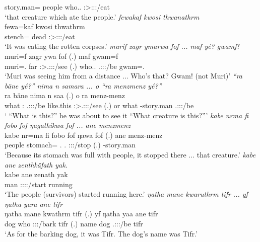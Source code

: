 \begin{exe}
	{\Dem} story.man={\Only} {\Emph} people who.\Erg.{\Sg} \Sg:\Sbj>\Stpl:\Obj:\Pst:\Ipfv/eat {\Emph}\\
	\trans `that creature which ate the people.'
	\emph{fewakaf kwosi thwanathrm}\\
	\gll fewa=kaf kwosi thwathrm\\ 
	stench={\Prop} dead \Sg:\Sbj>\Stpl:\Obj:\Pst:\Dur/eat\\
	\trans `It was eating the rotten corpses.'
	\emph{murif zagr ymarwa fof ... maf yé? gwamf!}\\
	\gll muri=f zagr ywa fof (.) maf  gwam=f\\ 
	muri=\Erg.{\Sg} far \Sg:\Sbj>\Tsg.\Masc:\Obj:\Pst:\Ipfv/see {\Emph} (.) who.\Erg.{\Sg} \Tsg.\Masc:\Sbj:\Nonpast:\Ipfv/be gwam=\Erg.\Sg\\
	\trans `Muri was seeing him from a distance ... Who's that? Gwam! (not Muri)'
	\emph{``ra bäne yé?'' nima n samara ... o ``ra menzmenz yé?''}\\
	\gll ra bäne  nima n saa (.) o ra menz-menz \\ 
	what \Dem:\Med{} \Tsg.\Masc:\Sbj:\Nonpast:\Ipfv/be like.this {\Imn} \Sg:\Sbj>\Tsg.\Masc:\Obj:\Pst:\Pfv/see (.) or what \Redup-story.man \Tsg.\Masc:\Sbj:\Nonpast:\Ipfv/be\\
	\trans ` ``What is this?'' he was about to see it ``What creature is this?'''
	\emph{kabe nrma fi fobo fof ŋagathikwa fof ... ane menzmenz}\\
	\gll kabe nr=ma fi fobo fof ŋawa fof (.) ane menz-menz\\ 
	people stomach={\Char} \Third.{\Abs} \Dist.{\All} {\Emph} \Sg:\Sbj:\Pst:\Ipfv/stop {\Emph} (.) {\Dem} \Redup-story.man\\
	\trans `Because its stomach was full with people, it stopped there ... that creature.'
	\emph{kabe ane zenthkäfath yak.}\\
	\gll kabe ane zenath yak\\ 
	man {\Dem} \Stpl:\Sbj:\Pst:\Ipfv:\Venit/start running\\
	\trans `The people (survivors) started running here.'
	\emph{ŋatha mane kwaruthrm tifr ... yf ŋatha yara ane tifr}\\
	\gll ŋatha mane kwathrm tifr (.) yf ŋatha yaa ane tifr\\ 
	dog who \Sg:\Sbj:\Pst:\Dur/bark tifr (.) name dog \Tsg.\Masc:\Sbj:\Pst:\Ipfv/be {\Dem} tifr\\
	\trans `As for the barking dog, it was Tifr. The dog's name was Tifr.'
	

\end{exe}
